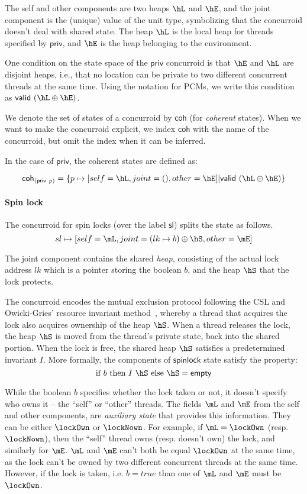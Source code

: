 The self and other components are two heaps $\hL$ and $\hE$, and the
joint component is the (unique) value of the unit type, symbolizing
that the concurroid doesn't deal with shared state. The heap $\hL$ is
the local heap for threads specified by $\mathsf{priv}$, and $\hE$ is
the heap belonging to the environment.

One condition on the state space of the $\mathsf{priv}$ concurroid is
that $\hE$ and $\hL$ are disjoint heaps, i.e., that no location can be
private to two different concurrent threads at the same time. Using
the notation for PCMs, we write this condition as
$\mathsf{valid}\ (\hL \oplus \hE)$.

We denote the set of states of a concurroid by $\mathsf{coh}$ (for
\emph{coherent} states). When we want to make the concurroid explicit,
we index $\mathsf{coh}$ with the name of the concurroid, but omit the
index when it can be inferred.

In the case of $\mathsf{priv}$, the coherent states are defined as:

\[
\mathsf{coh}_{(\mathsf{priv}\ p)} = \{p \mapsto [self = \hL, joint = (), other = \hE] | \mathsf{valid}\ (\hL \oplus \hE)\}
\]


\paragraph{Spin lock}

The concurroid for spin locks (over the label $\mathsf{sl}$) splits
the state as follows.
\[
sl \mapsto [self = \mL, joint = (lk \mapsto b) \oplus \hS, other = \mE]
\]

The joint component contains the shared \emph{heap}, consisting of the
actual lock address $lk$ which is a pointer storing the boolean $b$,
and the heap $\hS$ that the lock protects.

The concurroid encodes the mutual exclusion protocol following the CSL
and Owicki-Gries' resource invariant method~\cite{LeyWild-Nanevski:POPL13},
whereby a thread that acquires the lock also acquires ownership of the
heap $\hS$. When a thread releases the lock, the heap $\hS$ is moved
from the thread's private state, back into the shared portion. When
the lock is free, the shared heap $\hS$ satisfies a predetermined
invariant $I$. More formally, the components of $\mathsf{spinlock}$
state satisfy the property:
\[
\mbox{if}\ b\ \mbox{then}\ I\ \hS\ \mbox{else}\ \hS = \mathsf{empty}
\]

While the boolean $b$ specifies whether the lock taken or not, it
doesn't specify who owns it -- the ``self'' or ``other'' threads. The
fields $\mL$ and $\mE$ from the self and other components, are
\emph{auxiliary state} that provides this information. They can be
either $\lockOwn$ or $\lockNown$. For example, if $\mL = \lockOwn$
(resp. $\lockNown$), then the ``self'' thread owns (resp. doesn't own)
the lock, and similarly for $\mE$. $\mL$ and $\mE$ can't both be equal
$\lockOwn$ at the same time, as the lock can't be owned by two
different concurrent threads at the same time. However, if the lock is
taken, i.e. $b = true$ than one of $\mL$ and $\mE$ must be $\lockOwn$.

